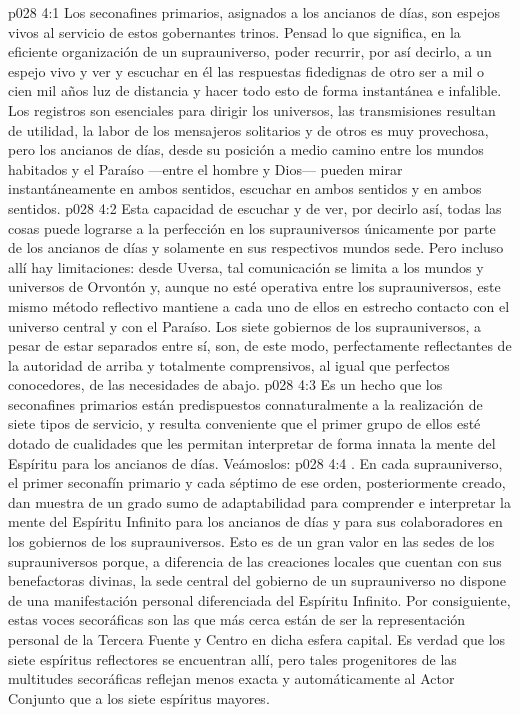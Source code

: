 \vs p028 4:1 Los seconafines primarios, asignados a los ancianos de días, son espejos vivos al servicio de estos gobernantes trinos. Pensad lo que significa, en la eficiente organización de un suprauniverso, poder recurrir, por así decirlo, a un espejo vivo y ver y escuchar en él las respuestas fidedignas de otro ser a mil o cien mil años luz de distancia y hacer todo esto de forma instantánea e infalible. Los registros son esenciales para dirigir los universos, las transmisiones resultan de utilidad, la labor de los mensajeros solitarios y de otros es muy provechosa, pero los ancianos de días, desde su posición a medio camino entre los mundos habitados y el Paraíso ---entre el hombre y Dios--- pueden mirar instantáneamente en ambos sentidos, escuchar en ambos sentidos y  en ambos sentidos.
\vs p028 4:2 Esta capacidad de escuchar y de ver, por decirlo así, todas las cosas puede lograrse a la perfección en los suprauniversos únicamente por parte de los ancianos de días y solamente en sus respectivos mundos sede. Pero incluso allí hay limitaciones: desde Uversa, tal comunicación se limita a los mundos y universos de Orvontón y, aunque no esté operativa entre los suprauniversos, este mismo método reflectivo mantiene a cada uno de ellos en estrecho contacto con el universo central y con el Paraíso. Los siete gobiernos de los suprauniversos, a pesar de estar separados entre sí, son, de este modo, perfectamente reflectantes de la autoridad de arriba y totalmente comprensivos, al igual que perfectos conocedores, de las necesidades de abajo.
\vs p028 4:3 \pc Es un hecho que los seconafines primarios están predispuestos connaturalmente a la realización de siete tipos de servicio, y resulta conveniente que el primer grupo de ellos esté dotado de cualidades que les permitan interpretar de forma innata la mente del Espíritu para los ancianos de días. Veámoslos:
\vs p028 4:4 . En cada suprauniverso, el primer seconafín primario y cada séptimo de ese orden, posteriormente creado, dan muestra de un grado sumo de adaptabilidad para comprender e interpretar la mente del Espíritu Infinito para los ancianos de días y para sus colaboradores en los gobiernos de los suprauniversos. Esto es de un gran valor en las sedes de los suprauniversos porque, a diferencia de las creaciones locales que cuentan con sus benefactoras divinas, la sede central del gobierno de un suprauniverso no dispone de una manifestación personal diferenciada del Espíritu Infinito. Por consiguiente, estas voces secoráficas son las que más cerca están de ser la representación personal de la Tercera Fuente y Centro en dicha esfera capital. Es verdad que los siete espíritus reflectores se encuentran allí, pero tales progenitores de las multitudes secoráficas reflejan menos exacta y automáticamente al Actor Conjunto que a los siete espíritus mayores.
